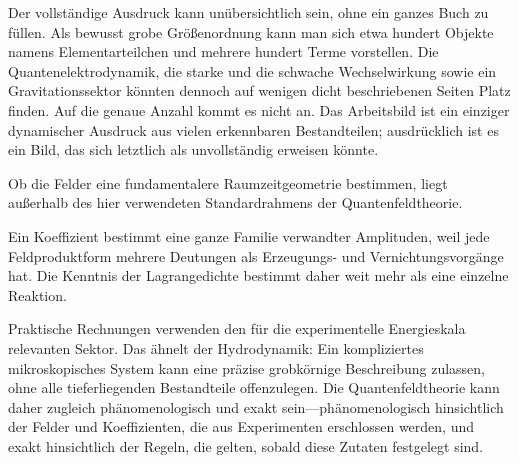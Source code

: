 Der vollständige Ausdruck kann unübersichtlich sein, ohne ein ganzes Buch zu füllen. Als bewusst grobe Größenordnung kann man sich etwa hundert Objekte namens Elementarteilchen und mehrere hundert Terme vorstellen. Die Quantenelektrodynamik, die starke und die schwache Wechselwirkung sowie ein Gravitationssektor könnten dennoch auf wenigen dicht beschriebenen Seiten Platz finden. Auf die genaue Anzahl kommt es nicht an. Das Arbeitsbild ist ein einziger dynamischer Ausdruck aus vielen erkennbaren Bestandteilen; ausdrücklich ist es ein Bild, das sich letztlich als unvollständig erweisen könnte.

Ob die Felder eine fundamentalere Raumzeitgeometrie bestimmen, liegt außerhalb des hier verwendeten Standardrahmens der Quantenfeldtheorie.

\begin{classroomqa}
\end{classroomqa}

Ein Koeffizient bestimmt eine ganze Familie verwandter Amplituden, weil jede Feldproduktform mehrere Deutungen als Erzeugungs- und Vernichtungsvorgänge hat. Die Kenntnis der Lagrangedichte bestimmt daher weit mehr als eine einzelne Reaktion.

\begin{classroomqa}
\end{classroomqa}

Praktische Rechnungen verwenden den für die experimentelle Energieskala relevanten Sektor. Das ähnelt der Hydrodynamik: Ein kompliziertes mikroskopisches System kann eine präzise grobkörnige Beschreibung zulassen, ohne alle tieferliegenden Bestandteile offenzulegen. Die Quantenfeldtheorie kann daher zugleich phänomenologisch und exakt sein---phänomenologisch hinsichtlich der Felder und Koeffizienten, die aus Experimenten erschlossen werden, und exakt hinsichtlich der Regeln, die gelten, sobald diese Zutaten festgelegt sind.

